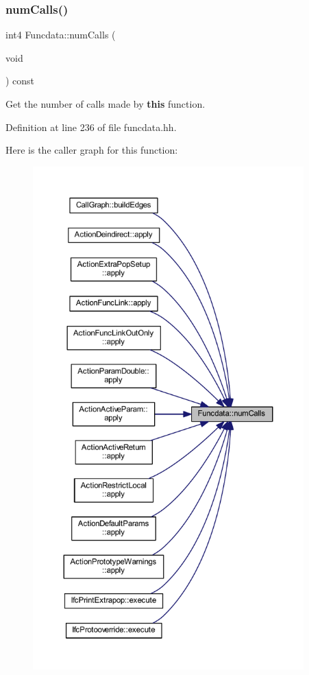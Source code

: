 \subsubsection{\texorpdfstring{numCalls()}{numCalls()}}
{\footnotesize\ttfamily int4 Funcdata\+::num\+Calls (\begin{DoxyParamCaption}\item[{void}]{ }\end{DoxyParamCaption}) const\hspace{0.3cm}{\ttfamily [inline]}}



Get the number of calls made by {\bfseries{this}} function. 



Definition at line 236 of file funcdata.\+hh.

Here is the caller graph for this function\+:
\nopagebreak
\begin{figure}[H]
\begin{center}
\leavevmode
\includegraphics[height=550pt]{class_funcdata_a0901453d881b28305cb071a3cc8a7fe9_icgraph}
\end{center}
\end{figure}
\mbox{\label{class_funcdata_a363bd02cb2f20cf1583951d5429a057b}} 
